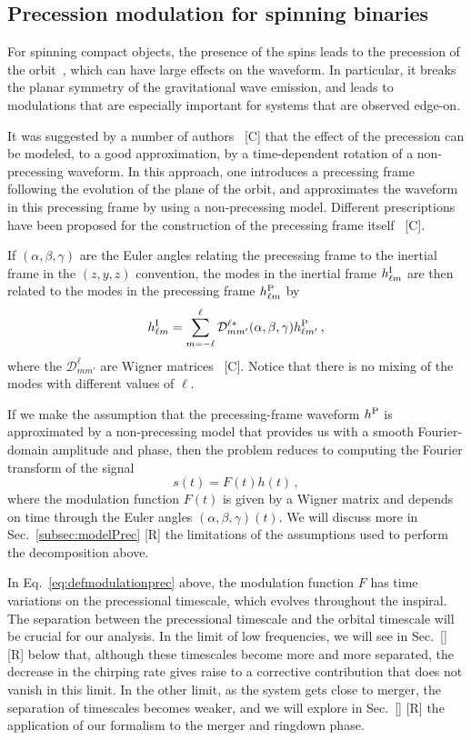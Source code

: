 \documentclass[aps,showpacs,twocolumn,
prd,superscriptaddress,nofootinbib]{revtex4-1}
\newcommand{\be}{\begin{equation}}
\newcommand{\ee}{\end{equation}}
\newcommand\calD{{\mathcal{D}}}
\newcommand{\SM}[1]{{\color{Red} #1}}
\begin{document}

\subsection{Precession modulation for spinning binaries}
\label{subsec:modulationPrec}

For spinning compact objects, the presence of the spins leads to the precession of the orbit~\cite{Apostolatos+94, Kidder95}, which can have large effects on the waveform. In particular, it breaks the planar symmetry of the gravitational wave emission, and leads to modulations that are especially important for systems that are observed edge-on.

It was suggested by a number of authors~\cite{} \SM{[C]} that the effect of the precession can be modeled, to a good approximation, by a time-dependent rotation of a non-precessing waveform. In this approach, one introduces a precessing frame following the evolution of the plane of the orbit, and approximates the waveform in this precessing frame by using a non-precessing model. Different prescriptions have been proposed for the construction of the precessing frame itself~\cite{} \SM{[C]}.

If $(\alpha, \beta, \gamma)$ are the Euler angles relating the precessing frame to the inertial frame in the $(z,y,z)$ convention, the modes in the inertial frame $h_{\ell m}^{\rm I}$ are then related to the modes in the precessing frame $h_{\ell m}^{\rm P}$ by~\cite{Goldberg+67}
\be\label{eq:wignerrotintro}
	h_{\ell m}^{\rm I} = \sum\limits_{m=-\ell}^{\ell} \calD^{\ell *}_{mm'} (\alpha,\beta,\gamma) h_{\ell m'}^{\rm P} \,,
\ee
where the $\calD^{\ell}_{mm'}$ are Wigner matrices~\cite{} \SM{[C]}. Notice that there is no mixing of the modes with different values of $\ell$.

If we make the assumption that the precessing-frame waveform $h^{\rm P}$ is approximated by a non-precessing model that provides us with a smooth Fourier-domain amplitude and phase, then the problem reduces to computing the Fourier transform of the signal
\be\label{eq:defmodulationprec}
	s(t) = F(t) h(t) \,,
\ee
where the modulation function $F(t)$ is given by a Wigner matrix and depends on time through the Euler angles $(\alpha, \beta, \gamma)(t)$. We will discuss more in Sec.~\ref{subsec:modelPrec} \SM{[R]} the limitations of the assumptions used to perform the decomposition above.

In Eq.~\eqref{eq:defmodulationprec} above, the modulation function $F$ has time variations on the precessional timescale, which evolves throughout the inspiral. The separation between the precessional timescale and the orbital timescale will be crucial for our analysis. In the limit of low frequencies, we will see in Sec.~\ref{} \SM{[R]} below that, although these timescales become more and more separated, the decrease in the chirping rate gives raise to a corrective contribution that does not vanish in this limit. In the other limit, as the system gets close to merger, the separation of timescales becomes weaker, and we will explore in Sec.~\ref{} \SM{[R]} the application of our formalism to the merger and ringdown phase.
\end{document}
